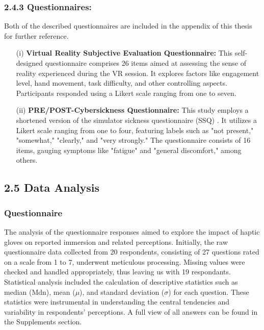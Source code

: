 \documentclass[12pt,oneside,openright]{report}
\begin{document}
\subsubsection*{2.4.3 Questionnaires:}
Both of the described questionnaires are included in the appendix of this thesis for further reference.

\begin{enumerate}
\item[(i)] \textbf{Virtual Reality Subjective Evaluation Questionnaire:} This self-designed questionnaire comprises 26 items aimed at assessing the sense of reality experienced during the VR session. It explores factors like engagement level, hand movement, task difficulty, and other controlling aspects. Participants responded using a Likert scale ranging from one to seven.

\item[(ii)] \textbf{PRE/POST-Cybersickness Questionnaire:} This study employs a shortened version of the simulator sickness questionnaire (SSQ) \parencite*{avpsy}. It utilizes a Likert scale ranging from one to four, featuring labels such as "not present," "somewhat," "clearly," and "very strongly." The questionnaire consists of 16 items, gauging symptoms like "fatigue" and "general discomfort," among others.
\end{enumerate}


\subsection*{2.5 Data Analysis}

\subsubsection*{Questionnaire}
The analysis of the questionnaire responses aimed to explore the impact of haptic gloves on reported immersion and related perceptions. Initially, the raw questionnaire data collected from 20 respondents, consisting of 27 questions rated on a scale from 1 to 7, underwent meticulous processing. Missing values were checked and handled appropriately, thus leaving us with 19 respondants. Statistical analysis included the calculation of descriptive statistics such as median ($\text{Mdn}$), mean ($\mu$), and standard deviation ($\sigma$) for each question. These statistics were instrumental in understanding the central tendencies and variability in respondents' perceptions. A full view of all answers can be found in the Supplements section. 
\end{document}
